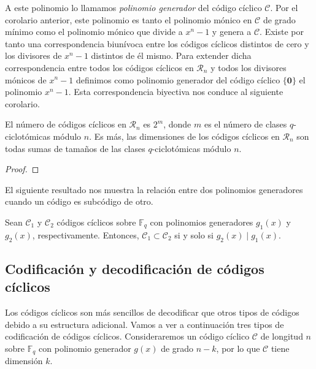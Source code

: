 A este polinomio lo llamamos \textit{polinomio generador} del código cíclico \(\mathcal C\).
Por el corolario anterior, este polinomio es tanto el polinomio mónico en \(\mathcal C\) de grado mínimo como el polinomio mónico que divide a \(x^n - 1\) y genera a \(\mathcal C\).
Existe por tanto una correspondencia biunívoca entre los códigos cíclicos distintos de cero y los divisores de \(x^n - 1\) distintos de él mismo.
Para extender dicha correspondencia entre todos los códigos cíclicos en \(\mathcal R_n\) y todos los divisores mónicos de \(x^n - 1\) definimos como polinomio generador del código cíclico \(\{\mathbf 0\}\) el polinomio \(x^n - 1\). 
Esta correspondencia biyectiva nos conduce al siguiente corolario.

\begin{corollary}
  El número de códigos cíclicos en \(\mathcal R_n\) es \(2^m\), donde \(m\) es el número de clases \(q\)-ciclotómicas módulo \(n\).
  Es más, las dimensiones de los códigos cíclicos en \(\mathcal R_n\) son todas sumas de tamaños de las clases \(q\)-ciclotómicas módulo \(n\).
\end{corollary}

\begin{proof}
\end{proof}


El siguiente resultado nos muestra la relación entre dos polinomios generadores cuando un código es subcódigo de otro.

\begin{corollary}
  Sean \(\mathcal C_1\) y \(\mathcal C_2\) códigos cíclicos sobre \(\mathbb F_q\) con polinomios generadores \(g_1(x)\) y \(g_2(x)\), respectivamente.
  Entonces, \(\mathcal C_1 \subset \mathcal C_2 \) si y solo si \(g_2(x) \mid g_1(x)\).
\end{corollary}


\subsection{Codificación y decodificación de códigos cíclicos}

Los códigos cíclicos son más sencillos de decodificar que otros tipos de códigos debido a su estructura adicional.
Vamos a ver a continuación tres tipos de codificación de códigos cíclicos.
Consideraremos un código cíclico \(\mathcal C\) de longitud \(n\) sobre \(\mathbb F_q\) con polinomio generador \(g(x)\) de grado \(n - k\), por lo que \(\mathcal C\) tiene dimensión \(k\).

